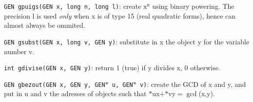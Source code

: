 {\tt GEN gpuigs(GEN x, long n, long l)}: create $\text{x}^{\text{n}}$ using
binary powering. The precision l is used {\sl only\/} when x is of type 15
(real quadratic forms), hence can almost always be ommited.

{\tt GEN gsubst(GEN x, long v, GEN y)}: substitute in x the object y for the 
variable number v.

{\tt int gdivise(GEN x, GEN y)}:  return 1 (true) if y divides x, 0 otherwise.

{\tt GEN gbezout(GEN x, GEN y, GEN$*$ u, GEN$*$ v)}: create the GCD of x and y,
and put in u and v the adresses of objects such that $*$ux$+$$*$vy$=\gcd$(x,y).


\vfill\eject
